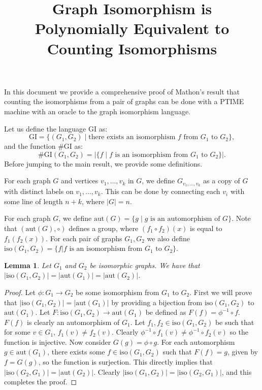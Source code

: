 \documentclass{article}
\title{Graph Isomorphism is Polynomially Equivalent to Counting Isomorphisms}
\def\shgi{\mbox{\#GI}}
\def\lgi{\mbox{GI}}
\def\aut{\mbox{aut}}
\def\iso{\mbox{iso}}
\newtheorem{lemma}[theo]{Lemma}
\begin{document}
\maketitle

In this document we provide a comprehensive proof of Mathon's result that counting the isomorphisms from a pair of graphs can be done with a PTIME machine with an oracle to the graph isomorphism language.

Let us define the language $\lgi$ as:
\[
\lgi = \{(G_1,G_2)\mid \mbox{there exists an isomorphism $f$ from $G_1$ to $G_2$} \},
\]
and the function $\shgi$ as:
\[
\shgi(G_1,G_2) = \vert \{ f \mid \mbox{$f$ is an isomorphism from $G_1$ to $G_2$}  \} \vert.
\]
Before jumping to the main result, we provide some definitions.

For each graph $G$ and vertices $v_1,\ldots,v_k$ in $G$, we define $G_{v_1,\ldots,v_k}$ as a copy of $G$ with distinct labels on $v_1,\ldots,v_k$. This can be done by connecting each $v_i$ with some line of length $n+k$, where $\vert G \vert = n$.

For each graph $G$, we define $\aut(G) = \{g\mid \mbox{$g$ is an automorphism of $G$} \}$. Note that $(\aut(G),\circ)$ defines a group, where $(f_1\circ f_2)(x)$ is equal to $f_1(f_2(x))$. For each pair of graphs $G_1,G_2$ we also define $\iso(G_1,G_2) = \{f\vert \mbox{$f$ is an isomorphism from $G_1$ to $G_2$}\}$.

\begin{lemma}\label{aut}
	Let $G_1$ and $G_2$ be isomorphic graphs. We have that $\vert \iso(G_1,G_2) \vert = \vert \aut(G_1) \vert = \vert \aut(G_2) \vert$.
\end{lemma}
\begin{proof}
	Let $\phi:G_1\to G_2$ be some isomorphism from $G_1$ to $G_2$. First we will prove that $\vert \iso(G_1,G_2) \vert  = \vert \aut(G_1) \vert$ by providing a bijection from $\iso(G_1,G_2)$ to $\aut(G_1)$. Let $F:\iso(G_1,G_2)\to\aut(G_1)$ be defined as $F(f) = \phi^{-1}\circ f$. $F(f)$ is clearly an automorphism of $G_1$. Let $f_1,f_2\in\iso(G_1,G_2)$ be such that for some $v\in G_1$, $f_1(v)\neq f_2(v)$. Clearly $\phi^{-1}\circ f_1(v) \neq \phi^{-1}\circ f_2(v)$ so the function is injective. Now consider $G(g) = \phi \circ g$. For each automorphism $g\in\aut(G_1)$, there exists some $f\in\iso(G_1,G_2)$ such that $F(f) = g$, given by $f = G(g)$, so the function is surjection. This directly implies that $\vert \iso(G_2,G_1) \vert  = \vert \aut(G_2) \vert$. Clearly $\vert\iso(G_1,G_2)\vert = \vert\iso(G_2,G_1)\vert$, and this completes the proof.
\end{proof}
\end{document}

